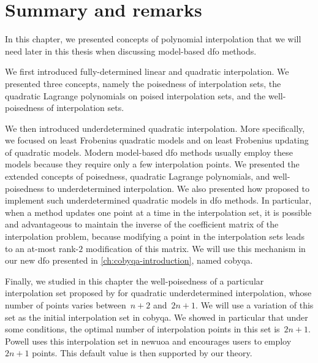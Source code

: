 \section{Summary and remarks}

In this chapter, we presented concepts of polynomial interpolation that we will need later in this thesis when discussing model-based \gls{dfo} methods.

We first introduced fully-determined linear and quadratic interpolation.
We presented three concepts, namely the poisedness of interpolation sets, the quadratic Lagrange polynomials on poised interpolation sets, and the well-poisedness of interpolation sets.

We then introduced underdetermined quadratic interpolation.
More specifically, we focused on least Frobenius quadratic models and on least Frobenius updating of quadratic models.
Modern model-based \gls{dfo} methods usually employ these models because they require only a few interpolation points.
We presented the extended concepts of poisedness, quadratic Lagrange polynomials, and well-poisedness to underdetermined interpolation.
We also presented how \citeauthor{Powell_2004b} proposed to implement such underdetermined quadratic models in \gls{dfo} methods.
In particular, when a method updates one point at a time in the interpolation set, it is possible and advantageous to maintain the inverse of the coefficient matrix of the interpolation problem, because modifying a point in the interpolation sets leads to an at-most rank-$2$ modification of this matrix.
We will use this mechanism in our new \gls{dfo} presented in \cref{ch:cobyqa-introduction}, named \gls{cobyqa}.

Finally, we studied in this chapter the well-poisedness of a particular interpolation set proposed by \citeauthor{Powell_2006} for quadratic underdetermined interpolation, whose number of points varies between~$n + 2$ and~$2n + 1$.
We will use a variation of this set as the initial interpolation set in \gls{cobyqa}.
We showed in particular that under some conditions, the optimal number of interpolation points in this set is~$2n + 1$.
Powell uses this interpolation set in \gls{newuoa} and encourages users to employ~$2n + 1$ points.
This default value is then supported by our theory.
